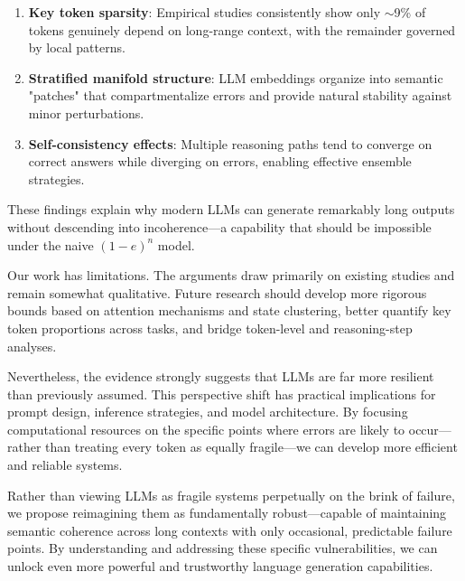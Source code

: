 \documentclass{article}
\begin{document}
\begin{enumerate}
\item \textbf{Key token sparsity}: Empirical studies consistently show only $\sim$9\% of tokens genuinely depend on long-range context, with the remainder governed by local patterns.
\item \textbf{Stratified manifold structure}: LLM embeddings organize into semantic "patches" that compartmentalize errors and provide natural stability against minor perturbations.
\item \textbf{Self-consistency effects}: Multiple reasoning paths tend to converge on correct answers while diverging on errors, enabling effective ensemble strategies.
\end{enumerate}

These findings explain why modern LLMs can generate remarkably long outputs without descending into incoherence—a capability that should be impossible under the naive $(1-e)^n$ model.

Our work has limitations. The arguments draw primarily on existing studies and remain somewhat qualitative. Future research should develop more rigorous bounds based on attention mechanisms and state clustering, better quantify key token proportions across tasks, and bridge token-level and reasoning-step analyses.

Nevertheless, the evidence strongly suggests that LLMs are far more resilient than previously assumed. This perspective shift has practical implications for prompt design, inference strategies, and model architecture. By focusing computational resources on the specific points where errors are likely to occur—rather than treating every token as equally fragile—we can develop more efficient and reliable systems.

Rather than viewing LLMs as fragile systems perpetually on the brink of failure, we propose reimagining them as fundamentally robust—capable of maintaining semantic coherence across long contexts with only occasional, predictable failure points. By understanding and addressing these specific vulnerabilities, we can unlock even more powerful and trustworthy language generation capabilities.



\end{document}
